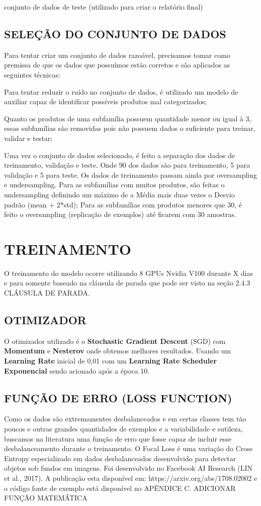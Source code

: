 conjunto de dados de teste (utilizado para criar o relatório final)

\subsection{SELEÇÃO DO CONJUNTO DE DADOS}

Para tentar criar um conjunto de dados razoável, precisamos tomar como premissa de que os dados que possuímos estão corretos e são aplicados as seguintes técnicas:

Para tentar reduzir o ruído no conjunto de dados, é utilizado um modelo de auxiliar capaz de identificar possíveis produtos mal categorizados;

Quanto os produtos de uma subfamília possuem quantidade menor ou igual à 3, essas subfamílias são removidas pois não possuem dados o suficiente para treinar, validar e testar;

Uma vez o conjunto de dados selecionado, é feito a separação dos dados de treinamento, validação e teste. Onde 90 dos dados são para treinamento, 5 para validação e 5 para teste. Os dados de treinamento passam ainda por oversampling e undersampling.
Para as subfamílias com muitos produtos, são feitas o undersampling definindo um máximo de a Média mais duas vezes o Desvio padrão (mean + 2*std);
Para as subfamílias com produtos menores que 30, é feito o oversampling (replicação de exemplos) até ficarem com 30 amostras.

\section{TREINAMENTO}

O treinamento do modelo ocorre utilizando 8 GPUs Nvidia V100 durante X dias e para somente baseado na cláusula de parada que pode ser visto na seção 2.4.3 CLÁUSULA DE PARADA. 

\subsection{OTIMIZADOR}

O otimizador utilizado é o \textbf{Stochastic Gradient Descent} (SGD) com \textbf{Momentum} e \textbf{Nesterov} onde obtemos melhores resultados. Usando um \textbf{Learning Rate} inicial de 0,01 com um \textbf{Learning Rate Scheduler Exponencial} sendo acionado após a época 10.

\subsection{FUNÇÃO DE ERRO (LOSS FUNCTION)}

Como os dados são extremamentes desbalanceados e em certas classes tem tão poucos e outras grandes quantidades de exemplos e a variabilidade e sutileza, buscamos na literatura uma função de erro que fosse capaz de incluir esse desbalanceamento durante o treinamento.
O Focal Loss é uma variação do Cross Entropy especializado em dados desbalanceados desenvolvido para detectar objetos sob fundos em imagens. Foi desenvolvido no Facebook AI Research (LIN et al., 2017). A publicação esta disponível em: https://arxiv.org/abs/1708.02002 e o código fonte de exemplo está disponível no APÊNDICE C.
ADICIONAR FUNÇÃO MATEMÁTICA
